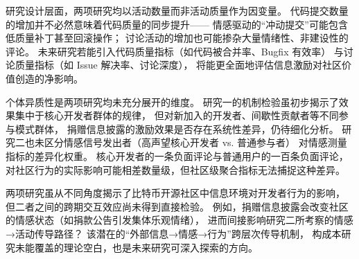 研究设计层面，两项研究均以活动数量而非活动质量作为因变量。
代码提交数量的增加并不必然意味着代码质量的同步提升——
情感驱动的“冲动提交”可能包含低质量补丁甚至回滚操作；
讨论活动的增加也可能掺杂大量情绪性、非建设性的评论。
未来研究若能引入代码质量指标（如代码被合并率、Bugfix 有效率）
与讨论质量指标（如 Issue 解决率、讨论深度），
将能更全面地评估信息激励对社区价值创造的净影响。

个体异质性是两项研究均未充分展开的维度。
研究一的机制检验虽初步揭示了效果集中于核心开发者群体的规律，
但对新加入的开发者、间歇性贡献者等不同参与模式群体，
捐赠信息披露的激励效果是否存在系统性差异，仍待细化分析。
研究二也未区分情感信号发出者（高声望核心开发者 vs. 普通参与者）
对情感测量指标的差异化权重。
核心开发者的一条负面评论与普通用户的一百条负面评论，
对社区行为的实际影响可能相差数量级，但社区级聚合指标无法捕捉这种差异。

两项研究虽从不同角度揭示了比特币开源社区中信息环境对开发者行为的影响，
但二者之间的跨期交互效应尚未得到直接检验。
例如，捐赠信息披露会改变社区的情感状态（如捐款公告引发集体乐观情绪），
进而间接影响研究二所考察的情感→活动传导路径？
该潜在的“外部信息→情感→行为”跨层次传导机制，
构成本研究未能覆盖的理论空白，也是未来研究可深入探索的方向。



